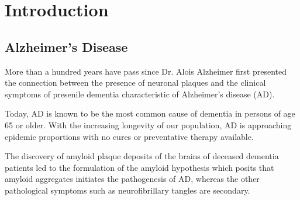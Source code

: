 \chapter{Introduction}


\section{Alzheimer's Disease}
\begin{outline}[enumerate]
	\1 More than a hundred years have pass since Dr. Alois Alzheimer first presented the connection between the presence of neuronal plaques and the clinical symptoms of presenile dementia characteristic of Alzheimer's disease (AD).
	
	\1 Today, AD is known to be the most common cause of dementia in persons of age 65 or older. With the increasing longevity of our population, AD is approaching epidemic proportions with no cures or preventative therapy available.\cite{Blennow:2006wd}

	\1 The discovery of amyloid plaque deposits of the brains of deceased dementia patients led to the formulation of the amyloid hypothesis which posits that amyloid aggregates initiates the pathogenesis of AD, whereas the other pathological symptoms such as neurofibrillary tangles are secondary.

\end{outline}


